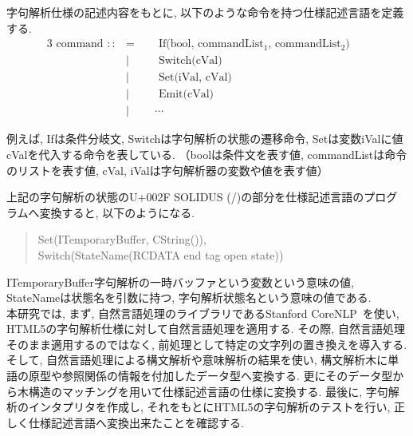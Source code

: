 \documentclass[10pt,twocolumn,uplatex,a4j]{jsreport}
\begin{document}
字句解析仕様の記述内容をもとに, 以下のような命令を持つ仕様記述言語を定義する. 
\begin{alignat*}{3}
    \mbox{ command }::&= &\ &\mbox{ If(bool, commandList$_1$, commandList$_2$)} &&\\
      &|& &\mbox{ Switch(cVal)} & &\\
      &|& &\mbox{ Set(iVal, cVal)} & & \\
      &|& &\mbox{ Emit(cVal)} & &\\
      &|& & \cdots & & 
\end{alignat*}

例えば, Ifは条件分岐文, Switchは字句解析の状態の遷移命令, Setは変数iValに値cValを代入する命令を表している. 
（boolは条件文を表す値, commandListは命令のリストを表す値, cVal, iValは字句解析器の変数や値を表す値）

上記の字句解析の状態のU+002F SOLIDUS (/)の部分を仕様記述言語のプログラムへ変換すると, 
以下のようになる. 
\begin{quote}
Set(ITemporaryBuffer, CString()), \\
Switch(StateName(RCDATA end tag open state)) 
\end{quote}

ITemporaryBuffer字句解析の一時バッファという変数という意味の値, 
StateNameは状態名を引数に持つ, 字句解析状態名という意味の値である. \\


本研究では, まず, 自然言語処理のライブラリであるStanford CoreNLP~\cite{manning-EtAl:2014:P14-5}を使い, HTML5の字句解析仕様に対して自然言語処理を適用する. 
その際, 自然言語処理そのまま適用するのではなく, 前処理として特定の文字列の置き換えを導入する. 
そして, 自然言語処理による構文解析や意味解析の結果を使い, 構文解析木に単語の原型や参照関係の情報を付加したデータ型へ変換する. 
更にそのデータ型から木構造のマッチングを用いて仕様記述言語の仕様に変換する. 
最後に, 字句解析のインタプリタを作成し, それをもとにHTML5の字句解析のテストを行い, 正しく仕様記述言語へ変換出来たことを確認する. 
\end{document}
